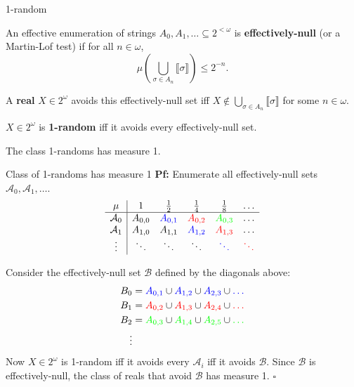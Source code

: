 \begin{frame}{1-random}
  \begin{define*}
    An effective enumeration of strings
    $A_0,A_1,\ldots \subseteq 2^{<\omega}$ is \textbf{effectively-null} (or a
    Martin-Lof test) if for all $n\in\omega$,
    \[\mu\left(\bigcup_{\sigma \in A_n} \llbracket\sigma\rrbracket \right)
    \leq 2^{-n}.\]

    \pause
    A \textbf{real} $X\in2^\omega$ avoids this effectively-null set iff
    $X\not\in \bigcup_{\sigma \in A_n} \llbracket\sigma\rrbracket$ for some
    $n\in\omega$.
  \end{define*}
  \pause

  \begin{define*}
    $X\in2^\omega$ is \textbf{1-random} iff it avoids every
    effectively-null set.
  \end{define*}
  \pause

  \begin{thm*}
    The class 1-randoms has measure 1.
  \end{thm*}
\end{frame}

\begin{frame}{Class of 1-randoms has measure 1}
  \textbf{Pf:} Enumerate all effectively-null sets
  $\mathcal{A}_0,\mathcal{A}_1,\ldots$.
  \pause
  \[\begin{array}{c|ccccc}
    \mu &1 &\frac{1}{2} &\frac{1}{4} &\frac{1}{8} &\ldots\\
    \hline
    \mathcal{A}_0 &A_{0,0} &\textcolor{blue}{A_{0,1}}
    &\textcolor{red}{A_{0,2}} &\textcolor{green}{A_{0,3}} &\ldots\\
    \mathcal{A}_1 &A_{1,0} &A_{1,1} &\textcolor{blue}{A_{1,2}}
    &\textcolor{red}{A_{1,3}} &\ldots\\
    \vdots &\ddots &\ddots &\ddots
    &\textcolor{blue}{\ddots} &\textcolor{red}{\ddots}
  \end{array}\]
  \pause

  Consider the effectively-null set $\mathcal{B}$ defined by the diagonals
  above:
  \begin{align*}
    B_0&= \textcolor{blue}{A_{0,1}} \cup \textcolor{blue}{A_{1,2}} \cup
    \textcolor{blue}{A_{2,3}} \cup \textcolor{blue}{\ldots}\\
    B_1&= \textcolor{red}{A_{0,2}} \cup \textcolor{red}{A_{1,3}} \cup
    \textcolor{red}{A_{2,4}} \cup \textcolor{red}{\ldots}\\
    B_2&= \textcolor{green}{A_{0,3}} \cup \textcolor{green}{A_{1,4}} \cup
    \textcolor{green}{A_{2,5}} \cup \textcolor{green}{\ldots}\\
    \vdots&
  \end{align*}
  \pause
  Now $X\in2^\omega$ is 1-random iff it avoids every $\mathcal{A}_i$ iff
  it avoids $\mathcal{B}$. Since $\mathcal{B}$ is effectively-null, the
  class of reals that avoid $\mathcal{B}$ has measure 1. $\square$
\end{frame}

